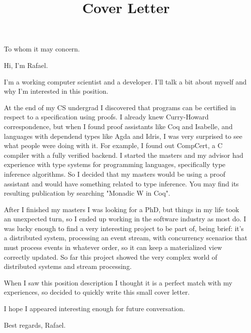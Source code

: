 \documentclass[11pt,a4paper,sans]{moderncv}
\title{Cover Letter}
\begin{document}
\makecvtitle %
To whom it may concern.

\medskip

Hi, I'm Rafael.

\medskip

I'm a working computer scientist and a developer.
I'll talk a bit about myself and why I'm interested in this position.

\medskip

At the end of my CS undergrad I discovered that programs can be certified in respect to a specification using proofs. I already knew Curry-Howard correspondence, but when I found proof assistants like Coq and Isabelle, and languages with dependend types like Agda and Idris, I was very surprised to see what people were doing with it. For example, I found out CompCert, a C compiler with a fully verified backend.
I started the masters and my advisor had experience with type systems for programming languages, specifically type inference algorithms. So I decided that my masters would be using a proof assistant and would have something related to type inference. You may find its resulting publication by searching "Monadic W in Coq".

\medskip

After I finished my masters I was looking for a PhD, but things in my life took an unexpected turn, so I ended up working in the software industry as most do. I was lucky enough to find a very interesting project to be part of, being brief: it’s a distributed system, processing an event stream,  with concurrency scenarios that must process events in whatever order, so it can keep a materialized view correctly updated. So far this project showed the very complex world of distributed systems and stream processing.

\medskip

When I saw this position description I thought it is a perfect match with my experiences, so decided to quickly write this small cover letter.

\medskip

I hope I appeared interesting enough for future conversation.

\medskip

Best regards, Rafael.
\end{document}
